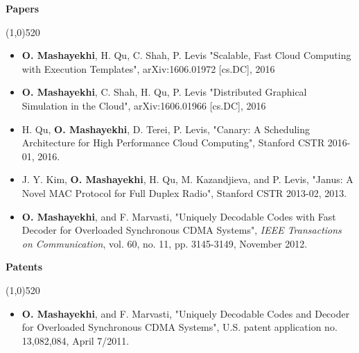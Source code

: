 \documentclass[letterpaper,10pt]{article}
\newcommand{\heading}[1] {
  {\large
    \begin{minipage}
    {\textwidth}
    {\textbf{#1}}
    \end{minipage}
  }
  \begin{center}
  \vspace{-15pt}
  \line(1,0){520}
  \end{center}
}
\begin{document}
\heading{Papers}

\begin{itemize}[noitemsep,topsep=0pt, leftmargin=.5cm, rightmargin=.5cm]


\item[]
\textbf{O. Mashayekhi}, H. Qu, C. Shah, P. Levis
"Scalable, Fast Cloud Computing with Execution Templates",
arXiv:1606.01972 [cs.DC], 2016


\vspace{5pt}

\item[]
\textbf{O. Mashayekhi}, C. Shah, H. Qu, P. Levis
"Distributed Graphical Simulation in the Cloud",
arXiv:1606.01966 [cs.DC], 2016

\vspace{5pt}

\item[]
H. Qu, \textbf{O. Mashayekhi}, D. Terei, P. Levis,
"Canary: A Scheduling Architecture for High Performance Cloud Computing",
Stanford CSTR 2016-01, 2016.


\vspace{5pt}

\item[]
J. Y. Kim, \textbf{O. Mashayekhi}, H. Qu, M. Kazandjieva, and P. Levis,
"Janus: A Novel MAC Protocol for Full Duplex Radio",
Stanford CSTR 2013-02, 2013.

\vspace{5pt}

\item[]
\textbf{O. Mashayekhi}, and F. Marvasti,
"Uniquely Decodable Codes with Fast Decoder for Overloaded Synchronous CDMA Systems",
\textit{IEEE Transactions on Communication}, vol. 60, no. 11, pp. 3145-3149, November 2012.

\end{itemize}

\vspace{5pt}





\heading{Patents}

\begin{itemize}[noitemsep,topsep=0pt, leftmargin=.5cm, rightmargin=.5cm]
\item[]
{\textbf{O. Mashayekhi}, and F. Marvasti, "Uniquely Decodable Codes and Decoder for Overloaded Synchronous CDMA Systems", U.S. patent application no. 13,082,084, April 7/2011.}
\end{itemize}

\vspace{5pt}
\end{document}
